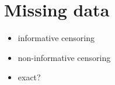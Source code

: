 \documentclass[12pt]{article}
\begin{document}
\section{Missing data}
\begin{itemize}
\item informative censoring
\item non-informative censoring
\item exact?
\end{itemize}

%
%
\end{document}
